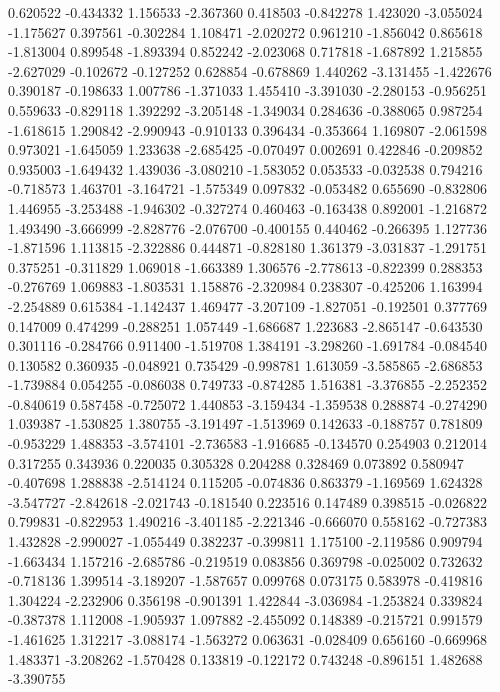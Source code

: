0.620522
-0.434332
1.156533
-2.367360
0.418503
-0.842278
1.423020
-3.055024
-1.175627
0.397561
-0.302284
1.108471
-2.020272
0.961210
-1.856042
0.865618
-1.813004
0.899548
-1.893394
0.852242
-2.023068
0.717818
-1.687892
1.215855
-2.627029
-0.102672
-0.127252
0.628854
-0.678869
1.440262
-3.131455
-1.422676
0.390187
-0.198633
1.007786
-1.371033
1.455410
-3.391030
-2.280153
-0.956251
0.559633
-0.829118
1.392292
-3.205148
-1.349034
0.284636
-0.388065
0.987254
-1.618615
1.290842
-2.990943
-0.910133
0.396434
-0.353664
1.169807
-2.061598
0.973021
-1.645059
1.233638
-2.685425
-0.070497
0.002691
0.422846
-0.209852
0.935003
-1.649432
1.439036
-3.080210
-1.583052
0.053533
-0.032538
0.794216
-0.718573
1.463701
-3.164721
-1.575349
0.097832
-0.053482
0.655690
-0.832806
1.446955
-3.253488
-1.946302
-0.327274
0.460463
-0.163438
0.892001
-1.216872
1.493490
-3.666999
-2.828776
-2.076700
-0.400155
0.440462
-0.266395
1.127736
-1.871596
1.113815
-2.322886
0.444871
-0.828180
1.361379
-3.031837
-1.291751
0.375251
-0.311829
1.069018
-1.663389
1.306576
-2.778613
-0.822399
0.288353
-0.276769
1.069883
-1.803531
1.158876
-2.320984
0.238307
-0.425206
1.163994
-2.254889
0.615384
-1.142437
1.469477
-3.207109
-1.827051
-0.192501
0.377769
0.147009
0.474299
-0.288251
1.057449
-1.686687
1.223683
-2.865147
-0.643530
0.301116
-0.284766
0.911400
-1.519708
1.384191
-3.298260
-1.691784
-0.084540
0.130582
0.360935
-0.048921
0.735429
-0.998781
1.613059
-3.585865
-2.686853
-1.739884
0.054255
-0.086038
0.749733
-0.874285
1.516381
-3.376855
-2.252352
-0.840619
0.587458
-0.725072
1.440853
-3.159434
-1.359538
0.288874
-0.274290
1.039387
-1.530825
1.380755
-3.191497
-1.513969
0.142633
-0.188757
0.781809
-0.953229
1.488353
-3.574101
-2.736583
-1.916685
-0.134570
0.254903
0.212014
0.317255
0.343936
0.220035
0.305328
0.204288
0.328469
0.073892
0.580947
-0.407698
1.288838
-2.514124
0.115205
-0.074836
0.863379
-1.169569
1.624328
-3.547727
-2.842618
-2.021743
-0.181540
0.223516
0.147489
0.398515
-0.026822
0.799831
-0.822953
1.490216
-3.401185
-2.221346
-0.666070
0.558162
-0.727383
1.432828
-2.990027
-1.055449
0.382237
-0.399811
1.175100
-2.119586
0.909794
-1.663434
1.157216
-2.685786
-0.219519
0.083856
0.369798
-0.025002
0.732632
-0.718136
1.399514
-3.189207
-1.587657
0.099768
0.073175
0.583978
-0.419816
1.304224
-2.232906
0.356198
-0.901391
1.422844
-3.036984
-1.253824
0.339824
-0.387378
1.112008
-1.905937
1.097882
-2.455092
0.148389
-0.215721
0.991579
-1.461625
1.312217
-3.088174
-1.563272
0.063631
-0.028409
0.656160
-0.669968
1.483371
-3.208262
-1.570428
0.133819
-0.122172
0.743248
-0.896151
1.482688
-3.390755
